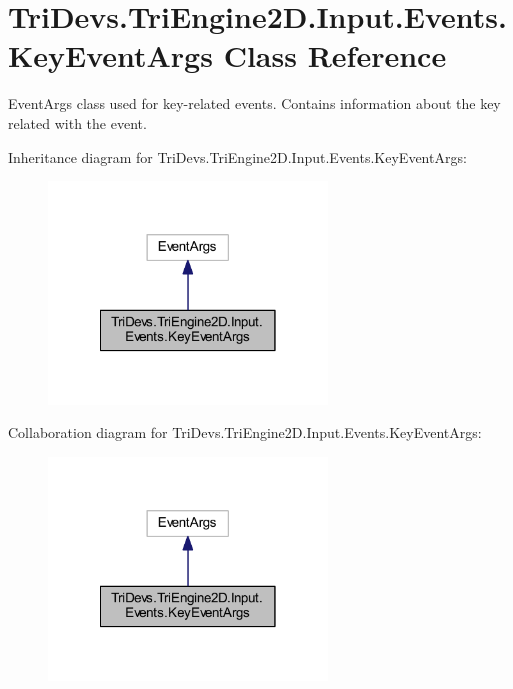 \hypertarget{class_tri_devs_1_1_tri_engine2_d_1_1_input_1_1_events_1_1_key_event_args}{\section{Tri\-Devs.\-Tri\-Engine2\-D.\-Input.\-Events.\-Key\-Event\-Args Class Reference}
\label{class_tri_devs_1_1_tri_engine2_d_1_1_input_1_1_events_1_1_key_event_args}
}


Event\-Args class used for key-\/related events. Contains information about the key related with the event.  




Inheritance diagram for Tri\-Devs.\-Tri\-Engine2\-D.\-Input.\-Events.\-Key\-Event\-Args\-:\nopagebreak
\begin{figure}[H]
\begin{center}
\leavevmode
\includegraphics[width=210pt]{class_tri_devs_1_1_tri_engine2_d_1_1_input_1_1_events_1_1_key_event_args__inherit__graph}
\end{center}
\end{figure}


Collaboration diagram for Tri\-Devs.\-Tri\-Engine2\-D.\-Input.\-Events.\-Key\-Event\-Args\-:\nopagebreak
\begin{figure}[H]
\begin{center}
\leavevmode
\includegraphics[width=210pt]{class_tri_devs_1_1_tri_engine2_d_1_1_input_1_1_events_1_1_key_event_args__coll__graph}
\end{center}
\end{figure}
